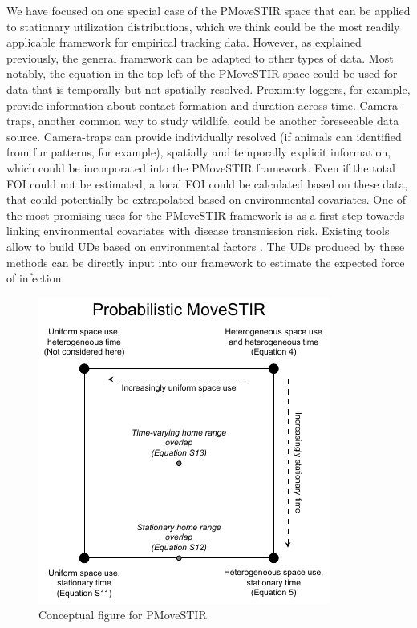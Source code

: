 \documentclass[letterpaper]{article}
\begin{document}
We have focused on one special case of the PMoveSTIR space that can be applied to stationary utilization distributions, which we think could be the most readily applicable framework for empirical tracking data. 
However, as explained previously, the general framework can be adapted to other types of data. Most notably, the equation in the top left of the PMoveSTIR space could be used for data that is temporally but not spatially resolved. Proximity loggers, for example, provide information about contact formation and duration across time. 
Camera-traps, another common way to study wildlife, could be another foreseeable data source. Camera-traps can provide individually resolved (if animals can identified from fur patterns, for example), spatially and temporally explicit information, which could be incorporated into the PMoveSTIR framework. Even if the total FOI could not be estimated, a local FOI could be calculated based on these data, that could potentially be extrapolated based on environmental covariates. 
One of the most promising uses for the PMoveSTIR framework is as a first step towards linking environmental covariates with disease transmission risk. 
Existing tools allow to build UDs based on environmental factors \citep{Signer2017,Michelot2020}. The UDs produced by these methods can be directly input into our framework to estimate the expected force of infection.






\begin{figure}
    \includegraphics[width=\textwidth]{figures/conceptual_figure_pmovestir.pdf}
    \caption{Conceptual figure for PMoveSTIR}
	\label{fig:square}
\end{figure}
\end{document}
